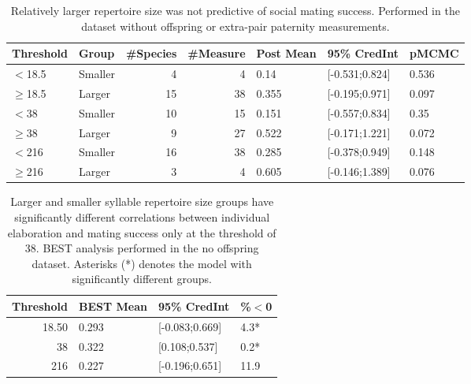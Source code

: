 \documentclass{article}
\begin{document}
  \begin{table}[H]
  \centering
  \caption{Relatively  larger  repertoire  size  was  not  predictive  of  social  mating  success.   Performed  in  the dataset without offspring or extra-pair paternity measurements.} 
  \begin{tabular}{llrrlll}
  \hline
  Threshold & Group & \#Species & \#Measure & Post Mean & 95\% CredInt & pMCMC \\ 
  \hline
  $<$18.5 & Smaller &   4 & 4 & 0.14 & [-0.531;0.824] & 0.536 \\ 
  $\ge$18.5 & Larger &  15 & 38 & 0.355 & [-0.195;0.971] & 0.097 \\ 
  $<$38 & Smaller &  10 & 15 & 0.151 & [-0.557;0.834] & 0.35 \\ 
  $\ge$38 & Larger &   9 & 27 & 0.522 & [-0.171;1.221] & 0.072 \\ 
  $<$216 & Smaller &  16 & 38 & 0.285 & [-0.378;0.949] & 0.148 \\ 
  $\ge$216 & Larger &   3 & 4 & 0.605 & [-0.146;1.389] & 0.076 \\ 
  \hline
  \end{tabular}
  \end{table}
  
  
  \begin{table}[H]
  \centering
  \caption{Larger and smaller syllable repertoire size groups have significantly different correlations between individual elaboration and mating success only at the threshold of 38.  BEST analysis performed in the no offspring dataset.  Asterisks (*) denotes the model with significantly different groups.} 
  \begin{tabular}{rlll}
  \hline
  Threshold & BEST Mean & 95\% CredInt & \%$<$0 \\ 
  \hline
  18.50 & 0.293 & [-0.083;0.669] & 4.3* \\ 
  38 & 0.322 & [0.108;0.537] & 0.2* \\ 
  216 & 0.227 & [-0.196;0.651] & 11.9 \\ 
  \hline
  \end{tabular}
  \end{table}
  
\end{document}
